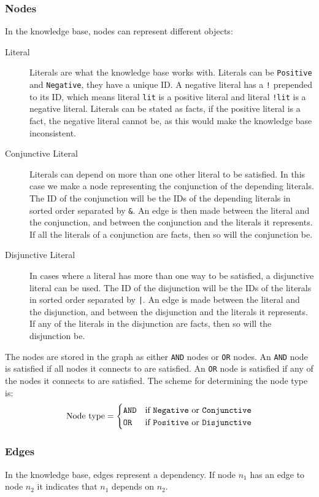 \documentclass[11pt]{article}
\begin{document}
\subsubsection{Nodes}
In the knowledge base, nodes can represent different objects:
\begin{description}
	\item[Literal] Literals are what the knowledge base works with. Literals can be {\tt Positive} and {\tt Negative}, they have a unique ID. A negative literal has a {\tt !} prepended to its ID, which means literal {\tt lit} is a positive literal and literal {\tt !lit} is a negative literal. Literals can be stated as facts, if the positive literal is a fact, the negative literal cannot be, as this would make the knowledge base inconsistent.
	
	\item[Conjunctive Literal] Literals can depend on more than one other literal to be satisfied. In this case we make a node representing the conjunction of the depending literals. The ID of the conjunction will be the IDs of the depending literals in sorted order separated by {\tt \&}. An edge is then made between the literal and the conjunction, and between the conjunction and the literals it represents. If all the literals of a conjunction are facts, then so will the conjunction be.
	
	\item[Disjunctive Literal] In cases where a literal has more than one way to be satisfied, a disjunctive literal can be used. The ID of the disjunction will be the IDs of the literals in sorted order separated by {\tt |}. An edge is made between the literal and the disjunction, and between the disjunction and the literals it represents. If any of the literals in the disjunction are facts, then so will the disjunction be.
\end{description}

The nodes are stored in the graph as either {\tt AND} nodes or {\tt OR} nodes. An {\tt AND} node is satisfied if all nodes it connects to are satisfied. An {\tt OR} node is satisfied if any of the nodes it connects to are satisfied. The scheme for determining the node type is:
$$
\text{Node type} = \begin{cases}
  {\text{\tt AND}} & \text{if {\tt Negative} or {\tt Conjunctive}} \\
  {\text {\tt OR}} & \text{if {\tt Positive} or {\tt Disjunctive}}
\end{cases}
$$

\subsubsection{Edges}
In the knowledge base, edges represent a dependency. If node $n_1$ has an edge to node $n_2$ it indicates that $n_1$ depends on $n_2$.
\end{document}
